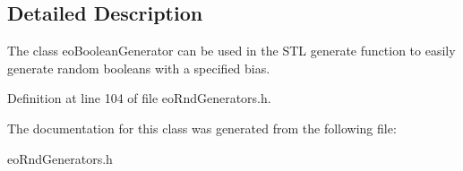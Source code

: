\subsection{Detailed Description}
The class eo\-Boolean\-Generator can be used in the STL generate function to easily generate random booleans with a specified bias. 



Definition at line 104 of file eo\-Rnd\-Generators.h.

The documentation for this class was generated from the following file:\begin{CompactItemize}
\item 
eo\-Rnd\-Generators.h\end{CompactItemize}
